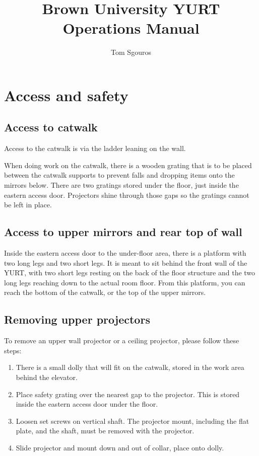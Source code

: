 \documentclass[11pt]{article}
\newcommand{\yurt}{YURT\xspace}
\begin{document}
\title{Brown University YURT Operations Manual}
\author{Tom Sgouros}
\maketitle

\tableofcontents

\setlength{\parskip}{10pt}
\setlength{\parindent}{0pt}

\section{Access and safety}

\subsection{Access to catwalk}

Access to the catwalk is via the ladder leaning on the wall.

When doing work on the catwalk, there is a wooden grating that is to
be placed between the catwalk supports to prevent falls and dropping
items onto the mirrors below.  There are two gratings stored under the
floor, just inside the eastern access door.  Projectors shine through
those gaps so the gratings cannot be left in place.

\subsection{Access to upper mirrors and rear top of wall}

Inside the eastern access door to the under-floor area, there is a
platform with two long legs and two short legs. It is meant to sit
behind the front wall of the \yurt, with two short legs resting on the
back of the floor structure and the two long legs reaching down to the
actual room floor.  From this platform, you can reach the bottom of
the catwalk, or the top of the upper mirrors.

\subsection{Removing upper projectors}

To remove an upper wall projector or a ceiling projector, please
follow these steps:

\begin{enumerate}
\item There is a small dolly that will fit on the catwalk, stored in
  the work area behind the elevator.

\item Place safety grating over the nearest gap to the projector.
  This is stored inside the eastern access door under the floor.

\item Loosen set screws on vertical shaft.  The projector mount,
  including the flat plate, and the shaft, must be removed with the
  projector.

\item Slide projector and mount down and out of collar, place onto
  dolly.
\end{enumerate}
\end{document}

